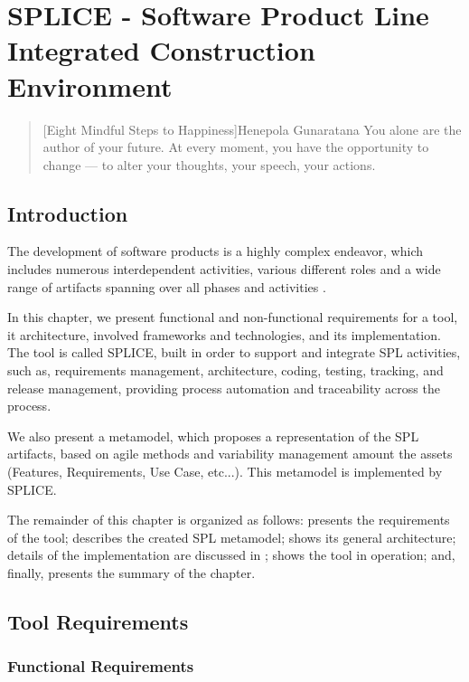 \chapter{SPLICE - Software Product Line Integrated Construction Environment}
\label{ch:splice}

\begin{quotation}[Eight Mindful Steps to Happiness]{Henepola Gunaratana}
You alone are the author of your future. At every moment, you have the opportunity to change --- to alter your thoughts, your speech, your actions.
\end{quotation}


\section{Introduction}
The development of software products is a highly complex endeavor, which includes numerous interdependent activities, various different roles and a wide range of artifacts spanning over all phases and activities \citep{lacheiner2011}.

In this chapter, we present functional and non-functional requirements for a tool, it architecture, involved frameworks and technologies, and its implementation. The tool is called \acf{SPLICE}, built in order to support and integrate \ac{SPL} activities, such as, requirements management, architecture, coding, testing, tracking, and release management, providing process automation and traceability across the process.

We also present a metamodel, which proposes a representation of the \ac{SPL} artifacts, based on agile methods  and variability management amount the assets (Features, Requirements, Use Case, etc...). This metamodel is implemented by \ac{SPLICE}.

The remainder of this chapter is organized as follows:  presents the requirements of the tool;  describes the created SPL metamodel;  shows its general architecture; details of the implementation are discussed in ;  shows the tool in operation; and, finally,  presents the summary of the chapter.



\section{Tool Requirements}
\label{sc:requiriments}
\subsection{Functional Requirements}

